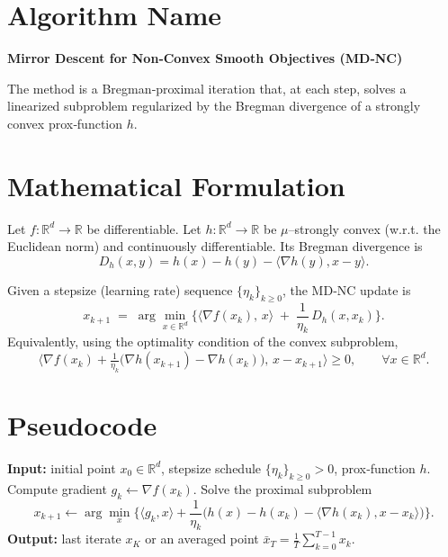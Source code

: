 \documentclass{article}
\newcommand{\grad}{\nabla}
\newcommand{\Breg}{D_h}
\newcommand{\R}{\mathbb{R}}
\begin{document}
\section*{Algorithm Name}
\textbf{Mirror Descent for Non‑Convex Smooth Objectives (MD‑NC)}  

The method is a Bregman‑proximal iteration that, at each step, solves a linearized
subproblem regularized by the Bregman divergence of a strongly convex
prox‑function $h$.

\section*{Mathematical Formulation}
Let $f:\R^{d}\rightarrow\R$ be differentiable.  
Let $h:\R^{d}\rightarrow\R$ be $\mu$–strongly convex (w.r.t. the Euclidean norm)
and continuously differentiable.  
Its Bregman divergence is
\[
\Breg(x,y)=h(x)-h(y)-\langle \nabla h(y),x-y\rangle .
\]

Given a stepsize (learning rate) sequence $\{\eta_k\}_{k\ge0}$,
the MD‑NC update is
\begin{equation}\label{eq:update}
x_{k+1}
\;=\;
\arg\min_{x\in\R^{d}}
\Big\{
\langle \grad f(x_k),\,x\rangle
\;+\;
\frac{1}{\eta_k}\,\Breg(x,x_k)
\Big\}.
\end{equation}
Equivalently, using the optimality condition of the convex subproblem,
\begin{equation}\label{eq:optcond}
\big\langle \grad f(x_k)+\tfrac{1}{\eta_k}\big(\nabla h(x_{k+1})-\nabla h(x_k)\big),\,x-x_{k+1}\big\rangle\ge 0,
\qquad\forall x\in\R^{d}.
\end{equation}

\section*{Pseudocode}
\begin{algorithm}[H]
\caption{Mirror Descent for Non‑Convex Smooth $f$}
\begin{algorithmic}[1]
\STATE \textbf{Input:} initial point $x_0\in\R^{d}$, stepsize schedule $\{\eta_k\}_{k\ge0}>0$, prox‑function $h$.
    \STATE Compute gradient $g_k\gets \grad f(x_k)$.
    \STATE Solve the proximal subproblem
    \[
    x_{k+1}\gets \arg\min_{x}
    \Big\{\langle g_k, x\rangle+\frac{1}{\eta_k}\big(h(x)-h(x_k)-\langle \nabla h(x_k),x-x_k\rangle\big)\Big\}.
    \]
\ENDFOR
\STATE \textbf{Output:} last iterate $x_K$ or an averaged point $\bar x_T=\frac1T\sum_{k=0}^{T-1}x_k$.
\end{algorithmic}
\end{algorithm}
\end{document}
